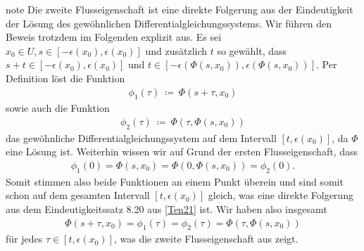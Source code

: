 \documentclass[letterpaper,10pt,german]{jupyterBook}
\begin{document}
\begin{sphinxadmonition}{note}
\sphinxAtStartPar
Die zweite Flusseigenschaft ist eine direkte Folgerung aus der Eindeutigkeit der Lösung des gewöhnlichen Differentialgleichungssystems.
Wir führen den Beweis trotzdem im Folgenden explizit aus.
Es sei \(x_0\in U, s\in [-\epsilon(x_0), \epsilon(x_0)]\) und zusätzlich \(t\) so gewählt, dass \(s+t \in [-\epsilon(x_0), \epsilon(x_0)]\) und \(t\in [-\epsilon(\Phi(s,x_0)), \epsilon(\Phi(s,x_0))]\).
Per Definition löst die Funktion
\begin{equation*}
\begin{split}\phi_1(\tau) \ \coloneqq \ \Phi(s + \tau, x_0)\end{split}
\end{equation*}
\sphinxAtStartPar
sowie auch die Funktion
\begin{equation*}
\begin{split}\phi_2(\tau) \ \coloneqq \ \Phi(\tau, \Phi(s,x_0))\end{split}
\end{equation*}
\sphinxAtStartPar
das gewöhnliche Differentialgleichungssystem auf dem Intervall \([t, \epsilon(x_0)]\), da \(\Phi\) eine Lösung ist.
Weiterhin wissen wir auf Grund der ersten Flusseigenschaft, dass
\begin{equation*}
\begin{split}\phi_1(0) = \Phi(s, x_0) = \Phi(0, \Phi(s, x_0)) = \phi_2(0).\end{split}
\end{equation*}
\sphinxAtStartPar
Somit stimmen also beide Funktionen an einem Punkt überein und sind somit schon auf dem gesamten Intervall \([t, \epsilon(x_0)]\) gleich, was eine direkte Folgerung aus dem Eindeutigkeitssatz 8.20 aus {[}\hyperlink{cite.references:id15}{Ten21}{]} ist.
Wir haben also insgesamt
\begin{equation*}
\begin{split}\Phi(s + \tau, x_0) = \phi_1(\tau) = \phi_2(\tau) = \Phi(\tau, \Phi(s,x_0))\end{split}
\end{equation*}
\sphinxAtStartPar
für jedes \(\tau\in [t, \epsilon(x_0)]\), was die zweite Flusseigenschaft aus {\hyperref[\detokenize{ode/fluesse:def:Fluss}]{}} zeigt.
\end{sphinxadmonition}
\end{document}
